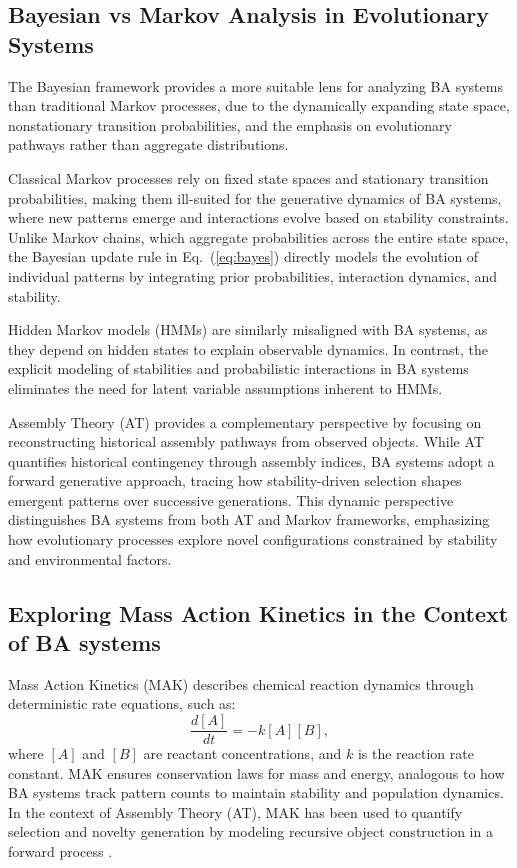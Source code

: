 \documentclass[entropy,article,submit,pdftex,oneauthor]{Definitions/mdpi}
\begin{document}
\subsection{Bayesian vs Markov Analysis in Evolutionary Systems}

The Bayesian framework provides a more suitable lens for analyzing BA systems than traditional Markov processes, due to the dynamically expanding state space, nonstationary transition probabilities, and the emphasis on evolutionary pathways rather than aggregate distributions. 

Classical Markov processes \cite{norris1997markov} rely on fixed state spaces and stationary transition probabilities, making them ill-suited for the generative dynamics of BA systems, where new patterns emerge and interactions evolve based on stability constraints. Unlike Markov chains, which aggregate probabilities across the entire state space, the Bayesian update rule in Eq.~(\ref{eq:bayes}) directly models the evolution of individual patterns by integrating prior probabilities, interaction dynamics, and stability.

Hidden Markov models (HMMs) \cite{rabiner1989hmm} are similarly misaligned with BA systems, as they depend on hidden states to explain observable dynamics. In contrast, the explicit modeling of stabilities and probabilistic interactions in BA systems eliminates the need for latent variable assumptions inherent to HMMs.

Assembly Theory (AT) provides a complementary perspective by focusing on reconstructing historical assembly pathways from observed objects. While AT quantifies historical contingency through assembly indices, BA systems adopt a forward generative approach, tracing how stability-driven selection shapes emergent patterns over successive generations. This dynamic perspective distinguishes BA systems from both AT and Markov frameworks, emphasizing how evolutionary processes explore novel configurations constrained by stability and environmental factors.

\subsection{Exploring Mass Action Kinetics in the Context of BA systems}

Mass Action Kinetics (MAK) \cite{TuranyiTomlin2014} describes chemical reaction dynamics through deterministic rate equations, such as:
\begin{equation}
\frac{d[A]}{dt} = -k[A][B],
\end{equation}
where \( [A] \) and \( [B] \) are reactant concentrations, and \( k \) is the reaction rate constant. MAK ensures conservation laws for mass and energy, analogous to how BA systems track pattern counts to maintain stability and population dynamics. In the context of Assembly Theory (AT), MAK has been used to quantify selection and novelty generation by modeling recursive object construction in a forward process \cite{walker2023nature}.
\end{document}
